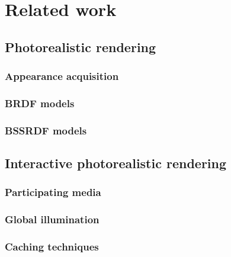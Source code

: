 \chapter{Related work}

\section{Photorealistic rendering}
\subsection{Appearance acquisition}
\subsection{BRDF models}
\subsection{BSSRDF models}

\section{Interactive photorealistic rendering}

\subsection{Participating media}
\subsection{Global illumination}
\subsection{Caching techniques}
